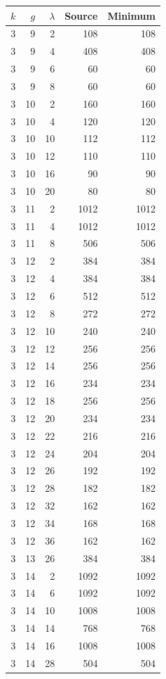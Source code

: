 \begin{longtable}{rrrrr}
\toprule $k$ & $g$ & $\lambda$ & Source & Minimum \\ \midrule\endhead
3 & 9 & 2 & 108 & 108 \\
3 & 9 & 4 & 408 & 408 \\
3 & 9 & 6 & 60 & 60 \\
3 & 9 & 8 & 60 & 60 \\
3 & 10 & 2 & 160 & 160 \\
3 & 10 & 4 & 120 & 120 \\
3 & 10 & 10 & 112 & 112 \\
3 & 10 & 12 & 110 & 110 \\
3 & 10 & 16 & 90 & 90 \\
3 & 10 & 20 & 80 & 80 \\
3 & 11 & 2 & 1012 & 1012 \\
3 & 11 & 4 & 1012 & 1012 \\
3 & 11 & 8 & 506 & 506 \\
3 & 12 & 2 & 384 & 384 \\
3 & 12 & 4 & 384 & 384 \\
3 & 12 & 6 & 512 & 512 \\
3 & 12 & 8 & 272 & 272 \\
3 & 12 & 10 & 240 & 240 \\
3 & 12 & 12 & 256 & 256 \\
3 & 12 & 14 & 256 & 256 \\
3 & 12 & 16 & 234 & 234 \\
3 & 12 & 18 & 256 & 256 \\
3 & 12 & 20 & 234 & 234 \\
3 & 12 & 22 & 216 & 216 \\
3 & 12 & 24 & 204 & 204 \\
3 & 12 & 26 & 192 & 192 \\
3 & 12 & 28 & 182 & 182 \\
3 & 12 & 32 & 162 & 162 \\
3 & 12 & 34 & 168 & 168 \\
3 & 12 & 36 & 162 & 162 \\
3 & 13 & 26 & 384 & 384 \\
3 & 14 & 2 & 1092 & 1092 \\
3 & 14 & 6 & 1092 & 1092 \\
3 & 14 & 10 & 1008 & 1008 \\
3 & 14 & 14 & 768 & 768 \\
3 & 14 & 16 & 1008 & 1008 \\
3 & 14 & 28 & 504 & 504 \\

\end{longtable}
